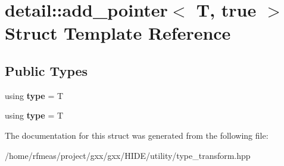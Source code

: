 \hypertarget{structdetail_1_1add__pointer_3_01T_00_01true_01_4}{}\section{detail\+:\+:add\+\_\+pointer$<$ T, true $>$ Struct Template Reference}
\label{structdetail_1_1add__pointer_3_01T_00_01true_01_4}
\subsection*{Public Types}
\begin{DoxyCompactItemize}
\item 
using {\bfseries type} = T\hypertarget{structdetail_1_1add__pointer_3_01T_00_01true_01_4_aeb35acb75f04bce1fc7fc1819845dff9}{}\label{structdetail_1_1add__pointer_3_01T_00_01true_01_4_aeb35acb75f04bce1fc7fc1819845dff9}

\item 
using {\bfseries type} = T\hypertarget{structdetail_1_1add__pointer_3_01T_00_01true_01_4_aeb35acb75f04bce1fc7fc1819845dff9}{}\label{structdetail_1_1add__pointer_3_01T_00_01true_01_4_aeb35acb75f04bce1fc7fc1819845dff9}

\end{DoxyCompactItemize}


The documentation for this struct was generated from the following file\+:\begin{DoxyCompactItemize}
\item 
/home/rfmeas/project/gxx/gxx/\+H\+I\+D\+E/utility/type\+\_\+transform.\+hpp\end{DoxyCompactItemize}

